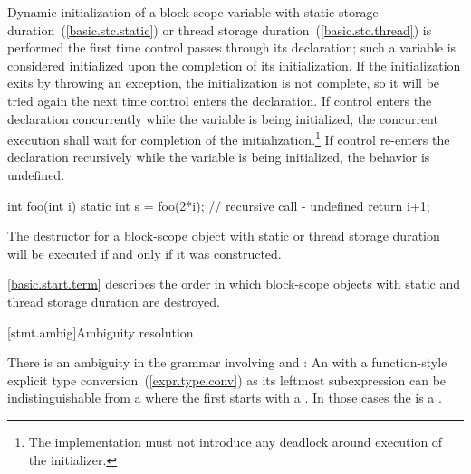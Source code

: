 \pnum
{}%
%
%
%
Dynamic initialization of a block-scope variable with
static storage duration~(\ref{basic.stc.static}) or
thread storage duration~(\ref{basic.stc.thread}) is performed
the first time control passes through its declaration; such a variable is
considered initialized upon the completion of its initialization. If the
initialization exits by throwing an exception, the initialization is not
complete, so it will be tried again the next time control enters the
declaration. If control enters the declaration concurrently while the variable is being initialized, the concurrent execution shall wait for completion of the initialization.\footnote{The implementation must not introduce any deadlock around execution of the initializer.} If control re-enters the declaration recursively while
the variable is being initialized, the behavior is undefined.
\begin{example}

\begin{codeblock}
int foo(int i) {
  static int s = foo(2*i);      // recursive call - undefined
  return i+1;
}
\end{codeblock}
\end{example}

\pnum
{}%
The destructor for a block-scope object with static or thread storage duration will be
executed if and only if it was constructed.
\begin{note}
\ref{basic.start.term} describes the order in which block-scope objects with
static and thread storage duration are destroyed.
\end{note}

[stmt.ambig]{Ambiguity resolution}%

\pnum
There is an ambiguity in the grammar involving
 and : An
 with a function-style explicit type
conversion~(\ref{expr.type.conv}) as its leftmost subexpression can be
indistinguishable from a  where the first
 starts with a \tcode{(}. In those cases the
 is a .

